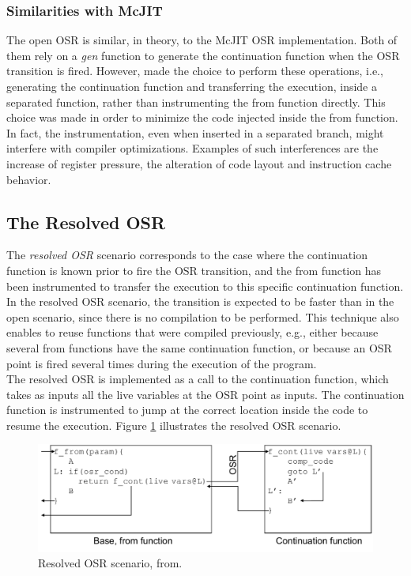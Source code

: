 \subsubsection{Similarities with McJIT}
The open OSR is similar, in theory, to the McJIT OSR implementation\cite{lameed2013modular}.
Both of them rely on a \textit{gen} function to generate the continuation function when the OSR transition is fired.
However,  made the choice to perform these operations, i.e., generating the continuation function and transferring the execution, inside a separated function, rather than instrumenting the from function directly.
This choice was made in order to minimize the code injected inside the from function.
In fact, the instrumentation, even when inserted in a separated branch, might interfere with compiler optimizations.
Examples of such interferences are the increase of register pressure, the alteration of code layout and instruction cache behavior.\\

\subsection{The Resolved OSR}

The \textit{resolved OSR} scenario corresponds to the case where the continuation function is known prior to fire the OSR transition, and the from function has been instrumented to transfer the execution to this specific continuation function.
In the resolved OSR scenario, the transition is expected to be faster than in the open scenario, since there is no compilation to be performed. 
This technique also enables to reuse functions that were compiled previously, e.g., either because several from functions have the same continuation function, or because an OSR point is fired several times during the execution of the program.\\

The resolved OSR is implemented as a call to the continuation function, which takes as inputs all the live variables at the OSR point as inputs.
The continuation function is instrumented to jump at the correct location inside the code to resume the execution. 
Figure \ref{ResolvedOSRFig} illustrates the resolved OSR scenario.\\

\begin{figure}[h]
\centering
\includegraphics[scale=0.5]{Figures/OSRKitResolvedScenario}
\decoRule
\caption[Resolved OSR Scenario]{Resolved OSR scenario, from\cite{OSRKit}.}
\label{ResolvedOSRFig}
\end{figure}

